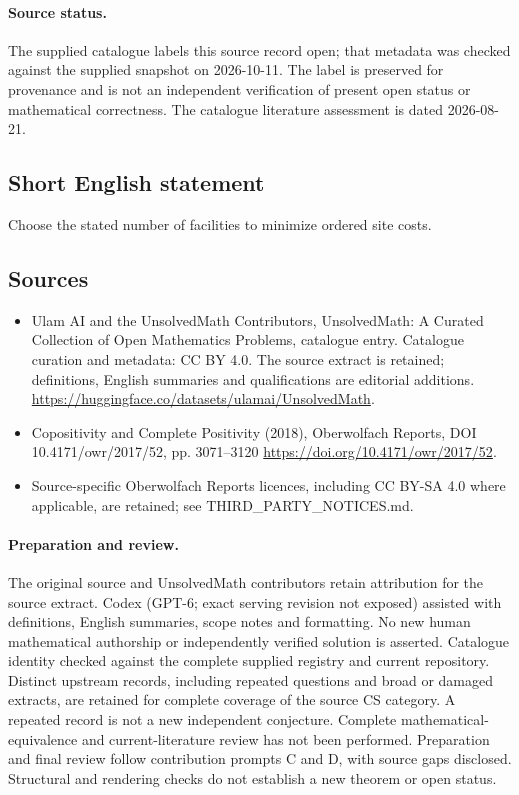 \documentclass[11pt]{article}
\begin{document}
\paragraph{Source status.}
The supplied catalogue labels this source record open; that metadata was checked against the supplied snapshot on 2026-10-11. The label is preserved for provenance and is not an independent verification of present open status or mathematical correctness. The catalogue literature assessment is dated 2026-08-21.
\subsection{Short English statement}
Choose the stated number of facilities to minimize ordered site costs.
\subsection{Sources}
\begin{itemize}
\item[S1] Ulam AI and the UnsolvedMath Contributors, UnsolvedMath: A Curated Collection of Open Mathematics Problems, catalogue entry. Catalogue curation and metadata: CC BY 4.0. The source extract is retained; definitions, English summaries and qualifications are editorial additions.
\url{https://huggingface.co/datasets/ulamai/UnsolvedMath}.
\item[S2] Copositivity and Complete Positivity (2018), Oberwolfach Reports, DOI 10.4171/owr/2017/52, pp. 3071--3120
\url{https://doi.org/10.4171/owr/2017/52}.
\item Source-specific Oberwolfach Reports licences, including CC BY-SA 4.0 where applicable, are retained; see THIRD\_PARTY\_NOTICES.md.
\end{itemize}
\paragraph{Preparation and review.}
The original source and UnsolvedMath contributors retain attribution for the source extract. Codex (GPT-6; exact serving revision not exposed) assisted with definitions, English summaries, scope notes and formatting. No new human mathematical authorship or independently verified solution is asserted. Catalogue identity checked against the complete supplied registry and current repository. Distinct upstream records, including repeated questions and broad or damaged extracts, are retained for complete coverage of the source CS category. A repeated record is not a new independent conjecture. Complete mathematical-equivalence and current-literature review has not been performed. Preparation and final review follow contribution prompts C and D, with source gaps disclosed. Structural and rendering checks do not establish a new theorem or open status.
\label{end:statement}
\end{document}
